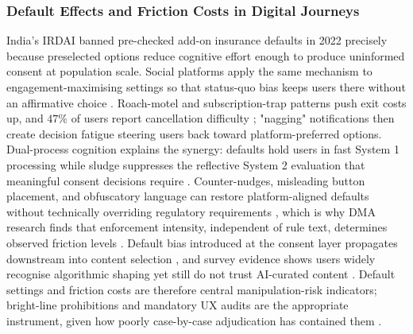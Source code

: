 \documentclass[11pt]{article}
\begin{document}
\subsubsection{Default Effects and Friction Costs in Digital Journeys}
\label{sec:default_effects_friction_costs} India's IRDAI banned pre-checked add-on insurance defaults in 2022 \parencites[8]{6295677} precisely because preselected options reduce cognitive effort enough to produce uninformed consent at population scale. Social platforms apply the same mechanism to engagement-maximising settings so that status-quo bias keeps users there without an affirmative choice \parencites[152]{1070605}[153]{1070605}. Roach-motel and subscription-trap patterns push exit costs up, and $47\%$ of users report cancellation difficulty \parencites[4]{6087241}[8]{6295677}; "nagging" notifications then create decision fatigue steering users back toward platform-preferred options. Dual-process cognition explains the synergy: defaults hold users in fast System 1 processing while sludge suppresses the reflective System 2 evaluation that meaningful consent decisions require \parencites[4]{6295677}. Counter-nudges, misleading button placement, and obfuscatory language can restore platform-aligned defaults without technically overriding regulatory requirements \parencites[9]{1070605}[12]{6295677}, which is why DMA research finds that enforcement intensity, independent of rule text, determines observed friction levels \parencites[152]{1070605}[160]{1070605}. Default bias introduced at the consent layer propagates downstream into content selection \parencites[3]{0123790}, and survey evidence shows users widely recognise algorithmic shaping yet still do not trust AI-curated content \parencites[20]{7646767}. Default settings and friction costs are therefore central manipulation-risk indicators; bright-line prohibitions and mandatory UX audits are the appropriate instrument, given how poorly case-by-case adjudication has contained them \parencites[12]{6295677}.
\end{document}
